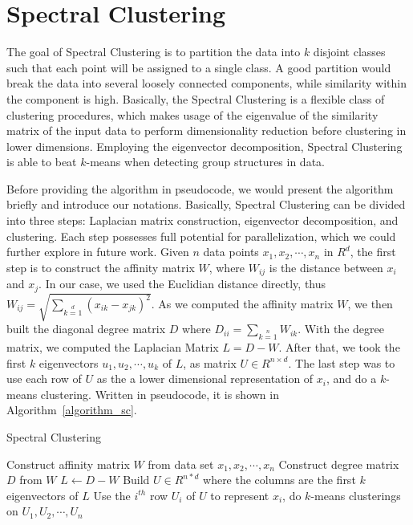 \documentclass{acm_proc_article-sp}
\begin{document}
\section{Spectral Clustering}
The goal of Spectral Clustering is to partition the data into $k$ disjoint classes such that each point will be assigned to a single class. A good partition would break the data into several loosely connected components, while similarity within the component is high.
Basically, the Spectral Clustering is a flexible class of clustering procedures, which makes usage of the eigenvalue of the similarity matrix of the input data to perform dimensionality reduction before clustering in lower dimensions. Employing the eigenvector decomposition, Spectral Clustering is able to beat $k$-means when detecting group structures in data.

Before providing the algorithm in pseudocode, we would present the algorithm briefly and introduce our notations. Basically, Spectral Clustering can be divided into three steps: Laplacian matrix construction, eigenvector decomposition, and clustering. Each step possesses full potential for parallelization, which we could further explore in future work. Given $n$ data points $x_1, x_2, \cdots, x_n$ in $R^d$, the first step is to construct the affinity matrix $W$, where $W_{ij}$ is the distance between $x_i$ and $x_j$. In our case, we used the Euclidian distance directly, thus $W_{ij} = \sqrt{\sum_{k=1}\limits^d(x_{ik} - x_{jk})^2}$. As we computed the affinity matrix $W$, we then built the diagonal degree matrix $D$ where $D_{ii} = \sum_{k=1}\limits^nW_{ik}$. With the degree matrix, we computed the Laplacian Matrix $L = D - W$. After that, we took the first $k$ eigenvectors $u_1, u_2, \cdots, u_k$ of $L$, as matrix $U \in R^{n\times d}$. The last step was to use each row of $U$ as the a lower dimensional representation of $x_i$, and do a $k$-means clustering. 
Written in pseudocode, it is shown in Algorithm~\ref{algorithm_sc}.
\begin{algorithm}
\caption{Spectral Clustering}
\label{CHalgorithm}
\begin{algorithmic}[1]
\State Construct affinity matrix $W$ from data set $x_1, x_2, \cdots, x_n$
\State Construct degree matrix $D$ from $W$
\State $L \leftarrow D - W$
\State Build $U \in R^{n*d}$ where the columns are the first $k$ eigenvectors of $L$ 
\State Use the $i^{th}$ row $U_i$ of $U$ to represent $x_i$, do $k$-means clusterings on $U_1, U_2, \cdots, U_n$
\end{algorithmic}
\label{algorithm_sc}
\end{algorithm}
\end{document}
